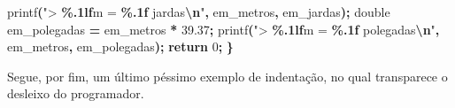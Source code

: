 \documentclass[
  11pt,
  a4paper,
]{scrbook}
\newenvironment{Shaded}{\begin{snugshade}}{\end{snugshade}}
\newcommand{\ControlFlowTok}[1]{\textcolor[rgb]{0.13,0.29,0.53}{\textbf{#1}}}
\newcommand{\DataTypeTok}[1]{\textcolor[rgb]{0.13,0.29,0.53}{#1}}
\newcommand{\DecValTok}[1]{\textcolor[rgb]{0.00,0.00,0.81}{#1}}
\newcommand{\FloatTok}[1]{\textcolor[rgb]{0.00,0.00,0.81}{#1}}
\newcommand{\NormalTok}[1]{#1}
\newcommand{\OperatorTok}[1]{\textcolor[rgb]{0.81,0.36,0.00}{\textbf{#1}}}
\newcommand{\SpecialCharTok}[1]{\textcolor[rgb]{0.81,0.36,0.00}{\textbf{#1}}}
\newcommand{\StringTok}[1]{\textcolor[rgb]{0.31,0.60,0.02}{#1}}
\begin{document}
\begin{Shaded}
\begin{Highlighting}[]
\NormalTok{        printf}\OperatorTok{(}\StringTok{"\textgreater{} }\SpecialCharTok{\%.1lf}\StringTok{m = }\SpecialCharTok{\%.1f}\StringTok{ jardas}\SpecialCharTok{\textbackslash{}n}\StringTok{"}\OperatorTok{,}\NormalTok{ em\_metros}\OperatorTok{,}\NormalTok{ em\_jardas}\OperatorTok{);}
        \DataTypeTok{double}\NormalTok{ em\_polegadas }\OperatorTok{=}\NormalTok{ em\_metros }\OperatorTok{*} \FloatTok{39.37}\OperatorTok{;}
\NormalTok{        printf}\OperatorTok{(}\StringTok{"\textgreater{} }\SpecialCharTok{\%.1lf}\StringTok{m = }\SpecialCharTok{\%.1f}\StringTok{ polegadas}\SpecialCharTok{\textbackslash{}n}\StringTok{"}\OperatorTok{,}\NormalTok{ em\_metros}\OperatorTok{,}\NormalTok{ em\_polegadas}\OperatorTok{);}
    \ControlFlowTok{return} \DecValTok{0}\OperatorTok{;}
\OperatorTok{\}}
\end{Highlighting}
\end{Shaded}

Segue, por fim, um último péssimo exemplo de indentação, no qual
transparece o desleixo do programador.
\end{document}

